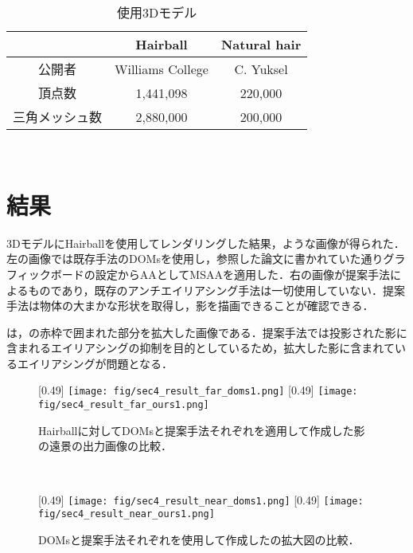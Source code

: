 \begin{table}[h]
\centering
    \caption{使用3Dモデル}
    \begin{tabular}{|c|c|c|} \hline
        & Hairball & Natural hair\\ \hline \hline
        公開者 & Williams College & C. Yuksel \\ \hline
        頂点数 & 1,441,098 & 220,000 \\ \hline
        三角メッシュ数 & 2,880,000 & 200,000 \\ \hline
    \end{tabular}
    \label{tab:3dmodel}
\end{table}\\
%
\section{結果}
\label{sec:result}
3DモデルにHairballを使用してレンダリングした結果，ような画像が得られた．左の画像では既存手法のDOMsを使用し，参照した論文に書かれていた通りグラフィックボードの設定からAAとしてMSAAを適用した．右の画像が提案手法によるものであり，既存のアンチエイリアシング手法は一切使用していない．提案手法は物体の大まかな形状を取得し，影を描画できることが確認できる．\par
{}は，の赤枠で囲まれた部分を拡大した画像である．提案手法では投影された影に含まれるエイリアシングの抑制を目的としているため，拡大した影に含まれているエイリアシングが問題となる．\\
\begin{figure}[h]
    \centering
        [0.49\linewidth]
            {\texttt{[image: fig/sec4\_result\_far\_doms1.png]}}
        [0.49\linewidth]
            {\texttt{[image: fig/sec4\_result\_far\_ours1.png]}}

    \caption{Hairballに対してDOMsと提案手法それぞれを適用して作成した影の遠景の出力画像の比較．}
    \label{fig:result_far}
\end{figure}\\
\begin{figure}[h]
    \centering
        [0.49\linewidth]
            {\texttt{[image: fig/sec4\_result\_near\_doms1.png]}}
        [0.49\linewidth]
            {\texttt{[image: fig/sec4\_result\_near\_ours1.png]}}

    \caption{DOMsと提案手法それぞれを使用して作成したの拡大図の比較．}
    \label{fig:result_enlarge}
\end{figure}\\
